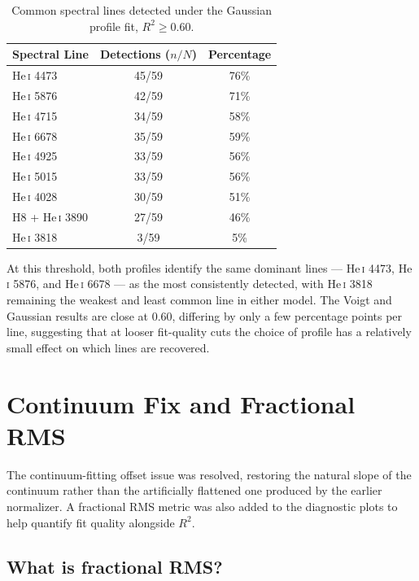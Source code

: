 \documentclass[12pt]{article}
\begin{document}
\begin{table}[htbp]
\centering
\caption{Common spectral lines detected under the Gaussian profile fit, $R^2 \geq 0.60$.}
\label{tab:gaussian-lines}
\begin{tabular}{@{}lcc@{}}
\toprule
\textbf{Spectral Line} & \textbf{Detections ($n/N$)} & \textbf{Percentage} \\
\midrule
He\,\textsc{i} 4473        & 45/59 & 76\% \\
He\,\textsc{i} 5876        & 42/59 & 71\% \\
He\,\textsc{i} 4715        & 34/59 & 58\% \\
He\,\textsc{i} 6678        & 35/59 & 59\% \\
He\,\textsc{i} 4925        & 33/59 & 56\% \\
He\,\textsc{i} 5015        & 33/59 & 56\% \\
He\,\textsc{i} 4028        & 30/59 & 51\% \\
H8 + He\,\textsc{i} 3890   & 27/59 & 46\% \\
He\,\textsc{i} 3818        & 3/59  & 5\%  \\
\bottomrule
\end{tabular}
\end{table}

At this threshold, both profiles identify the same dominant lines --- He\,\textsc{i} 4473, He\,\textsc{i} 5876, and He\,\textsc{i} 6678 --- as the most consistently detected, with He\,\textsc{i} 3818 remaining the weakest and least common line in either model. The Voigt and Gaussian results are close at 0.60, differing by only a few percentage points per line, suggesting that at looser fit-quality cuts the choice of profile has a relatively small effect on which lines are recovered.

\section{Continuum Fix and Fractional RMS}
\label{sec:continuum-fix}

The continuum-fitting offset issue was resolved, restoring the natural slope of the continuum rather than the artificially flattened one produced by the earlier normalizer. A fractional RMS metric was also added to the diagnostic plots to help quantify fit quality alongside $R^2$.

\subsection{What is fractional RMS?}
\label{subsec:fractional-rms}
\end{document}
